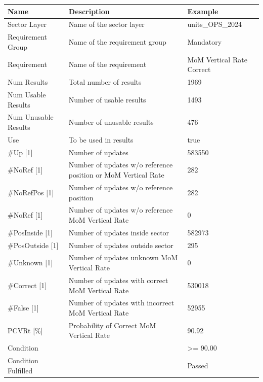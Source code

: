 \begin{center}
 \begin{table}[H]
  \begin{tabularx}{\textwidth}{ | l | X |  l | }
    \hline
    \textbf{Name} & \textbf{Description} & \textbf{Example} \\ \hline
    Sector Layer & Name of the sector layer & units\_OPS\_2024 \\ \hline
    Requirement Group & Name of the requirement group & Mandatory \\ \hline
    Requirement & Name of the requirement & MoM Vertical Rate Correct \\ \hline
    Num Results & Total number of results & 1969 \\ \hline
    Num Usable Results & Number of usable results & 1493 \\ \hline
    Num Unusable Results & Number of unusable results & 476 \\ \hline
    Use & To be used in results & true \\ \hline
    \#Up [1] & Number of updates & 583550 \\ \hline
    \#NoRef [1] & Number of updates w/o reference position or MoM Vertical Rate & 282 \\ \hline
    \#NoRefPos [1] & Number of updates w/o reference position & 282 \\ \hline
    \#NoRef [1] & Number of updates w/o reference MoM Vertical Rate & 0 \\ \hline
    \#PosInside [1] & Number of updates inside sector & 582973 \\ \hline
    \#PosOutside [1] & Number of updates outside sector & 295 \\ \hline
    \#Unknown [1] & Number of updates unknown MoM Vertical Rate & 0 \\ \hline
    \#Correct [1] & Number of updates with correct MoM Vertical Rate & 530018 \\ \hline
    \#False [1] & Number of updates with incorrect MoM Vertical Rate & 52955 \\ \hline
    PCVRt [\%] & Probability of Correct MoM Vertical Rate & 90.92 \\ \hline
    Condition &  & >= 90.00 \\ \hline
    Condition Fulfilled &  & Passed \\ \hline
\end{tabularx}
\end{table}
\end{center}

